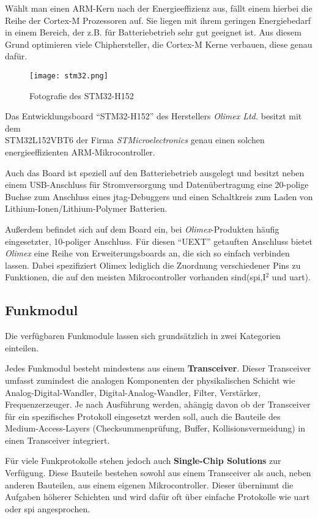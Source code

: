 Wählt man einen ARM-Kern nach der Energieeffizienz aus, fällt einem hierbei die
Reihe der Cortex-M Prozessoren auf. Sie liegen mit ihrem geringen Energiebedarf
in einem Bereich, der z.B. für Batteriebetrieb sehr gut geeignet ist. Aus diesem
Grund optimieren viele Chiphersteller, die Cortex-M Kerne verbauen, diese genau
dafür.

\begin{figure}[!ht]
\centering
\texttt{[image: stm32.png]}\\
\caption{Fotografie des STM32-H152}{}
\end{figure}

Das Entwicklungsboard "`STM32-H152"'\cite{OLI2} des Herstellers
\emph{Olimex Ltd.} besitzt mit dem \\STM32L152VBT6 der Firma
\emph{STMicroelectronics} genau einen solchen
energieeffizienten ARM-Mikrocontroller.

Auch das Board ist speziell auf den Batteriebetrieb ausgelegt und besitzt neben
einem USB-Anschluss für Stromversorgung und Datenübertragung eine 20-polige Buchse zum
Anschluss eines \gls{jtag}-Debuggers und einen Schaltkreis zum Laden von
Lithium-Ionen/Lithium-Polymer Batterien.

Außerdem befindet sich auf dem Board ein, bei \emph{Olimex}-Produkten häufig
eingesetzter, 10-poliger Anschluss. Für diesen "`UEXT"' getauften Anschluss
bietet \emph{Olimex} eine Reihe von Erweiterungsboards an, die sich so einfach
verbinden lassen. Dabei spezifiziert Olimex lediglich die Zuordnung
verschiedener Pins zu Funktionen, die auf den meisten Mikrocontroller
vorhanden sind(\gls{spi},I$^2$ und \gls{uart}).

\subsection{Funkmodul} Die verfügbaren Funkmodule lassen
sich grundsätzlich in zwei Kategorien einteilen.

Jedes Funkmodul besteht mindestens aus einem \textbf{Transceiver}. Dieser
Transceiver umfasst zumindest die analogen Komponenten der physikalischen
Schicht wie Analog-Digital-Wandler, Digital-Analog-Wandler, Filter, Verstärker,
Frequenzerzeuger. Je nach Ausführung werden, ahängig davon ob der Transceiver
für ein spezifisches Protokoll eingesetzt werden soll, auch die Bauteile des
Medium-Access-Layers (Checksummenprüfung, Buffer, Kollisionsvermeidung) in
einen Transceiver integriert.

Für viele Funkprotokolle stehen jedoch auch \textbf{Single-Chip Solutions}
zur Verfügung. Diese Bauteile bestehen sowohl aus einem Transceiver als auch,
neben anderen Bauteilen, aus einem eigenen Mikrocontroller. Dieser übernimmt die
Aufgaben höherer Schichten und wird dafür oft über einfache Protokolle wie
\gls{uart} oder \gls{spi} angesprochen.

